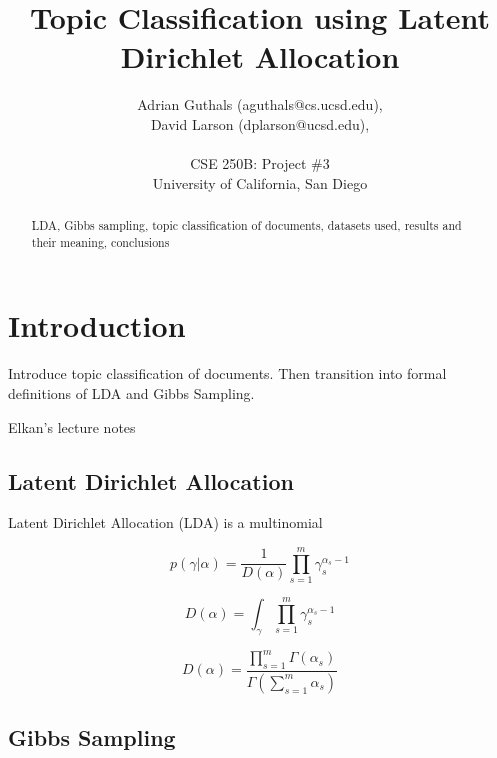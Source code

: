 \documentclass[10pt]{article}
\title{Topic Classification using Latent Dirichlet Allocation}
\author{Adrian Guthals (aguthals@cs.ucsd.edu),\\
David Larson (dplarson@ucsd.edu),\\
\\
CSE 250B: Project \#3 \\
University of California, San Diego \\
}
\begin{document}
\maketitle


\begin{abstract}
    LDA, Gibbs sampling, topic classification of documents, datasets used, results and their meaning, conclusions
\end{abstract}



\section{Introduction}
\label{sec:intro}

Introduce topic classification of documents. Then transition into formal definitions of LDA and Gibbs Sampling.

Elkan's lecture notes \cite{CSE250B}


\subsection{Latent Dirichlet Allocation}
\label{sec:lda}

Latent Dirichlet Allocation (LDA) is a multinomial

\begin{equation}
    p(\gamma | \alpha) = \frac{1}{D(\alpha)} \prod_{s=1}^{m} \gamma_{s}^{\alpha_s - 1}
\end{equation}

\begin{equation}
    D(\alpha) = \int_{\gamma} \prod_{s=1}^m \gamma_s^{\alpha_s - 1}
\end{equation}

\begin{equation}
    D(\alpha) = \frac{\prod_{s=1}^m \Gamma(\alpha_s)}{\Gamma (\sum_{s=1}^m \alpha_s )}
\end{equation}



\subsection{Gibbs Sampling}
\label{sec:gibbs}
\end{document}
